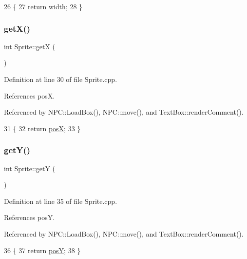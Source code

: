 \begin{DoxyCode}
26 \{
27     \textcolor{keywordflow}{return} \hyperlink{class_sprite_a0a3364944c5e361fc9e7ae406224d682}{width};
28 \}
\end{DoxyCode}
\mbox{\label{class_sprite_a03d6c82bddfd3d164ce8997482c57c85}} 
\subsubsection{\texorpdfstring{get\+X()}{getX()}}
{\footnotesize\ttfamily int Sprite\+::getX (\begin{DoxyParamCaption}{ }\end{DoxyParamCaption})}



Definition at line 30 of file Sprite.\+cpp.



References posX.



Referenced by N\+P\+C\+::\+Load\+Box(), N\+P\+C\+::move(), and Text\+Box\+::render\+Comment().


\begin{DoxyCode}
31 \{
32     \textcolor{keywordflow}{return} \hyperlink{class_sprite_a0af496e3e6540f1f1321913a741a737a}{posX};
33 \}
\end{DoxyCode}
\mbox{\label{class_sprite_a53ea8b27bcd0dab0627a2dceab2b9d98}} 
\subsubsection{\texorpdfstring{get\+Y()}{getY()}}
{\footnotesize\ttfamily int Sprite\+::getY (\begin{DoxyParamCaption}{ }\end{DoxyParamCaption})}



Definition at line 35 of file Sprite.\+cpp.



References posY.



Referenced by N\+P\+C\+::\+Load\+Box(), N\+P\+C\+::move(), and Text\+Box\+::render\+Comment().


\begin{DoxyCode}
36 \{
37     \textcolor{keywordflow}{return} \hyperlink{class_sprite_a1ef80a5eff9d5b0bb90ae355daf09efe}{posY};
38 \}
\end{DoxyCode}
\mbox{\label{class_sprite_adab722e01e4d3e197f52ecad6ac8d70a}} 

